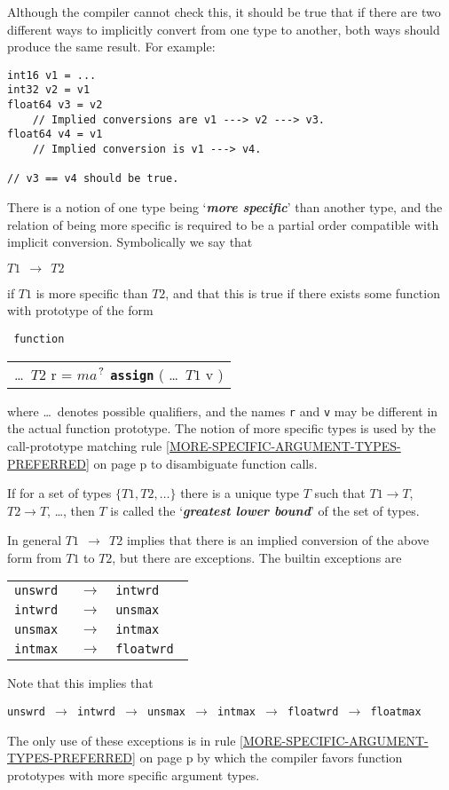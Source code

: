 \documentclass[12pt]{article}
\makeatletter
\newcommand{\TT}[1]{{\tt \bfseries #1}}
\newcommand{\key}[1]{{\bf \em #1}\index{#1}}
\newcommand{\mkey}[2]{{\bf \em #1}\index{#1!#2}}
\newcommand{\ttkey}[1]{\TT{#1}\index{#1@{\tt #1}}}
\newcommand{\pagref}[1]{p\pageref{#1}}
\newcommand{\QMARK}{{$^{\,\mbox{\footnotesize ?}}$}}
\newcommand{\CNV}{\longrightarrow}	%
\newenvironment{indpar}[1][0.3in]%
	{\begin{list}{}%
		     {\setlength{\itemsep}{0in}%
		      \setlength{\topsep}{0in}%
		      \setlength{\parsep}{1ex}%
		      \setlength{\labelwidth}{#1}%
		      \setlength{\leftmargin}{#1}%
		      \addtolength{\leftmargin}{\labelsep}}%
	 \item}%
	{\end{list}}
\makeatother
\begin{document}
Although the compiler cannot check this, it should be true
that if there are two different ways to implicitly convert from
one type to another, both ways should produce the same
result.  For example:
\begin{indpar}\begin{verbatim}
int16 v1 = ...
int32 v2 = v1
float64 v3 = v2
    // Implied conversions are v1 ---> v2 ---> v3.
float64 v4 = v1
    // Implied conversion is v1 ---> v4.

// v3 == v4 should be true.
\end{verbatim}\end{indpar}

There is a notion of one type being `\mkey{more specific}{type}' than
another type, and the relation of being more specific is required
to be a partial order compatible with implicit conversion.  Symbolically
we say that
\begin{center}
{\tt $T1~~\CNV~~T2$}
\end{center}%
\label{MORE-SPECIFIC-RELATION}
if $T1$ is more specific than $T2$, and that this is true if 
there exists some function with prototype of the form

\begin{center} \tt
function \begin{tabular}[t]{@{}l@{}}
	 \ldots{}~$T2$ r =
	 $ma$\QMARK{} \ttkey{assign}
	 ( \ldots{}~$T1$ v )
	 \end{tabular}
\end{center}
where \ldots{}~denotes possible qualifiers, and
the names {\tt r} and {\tt v} may be different
in the actual function prototype.
The notion of more specific
types is used by the
call-prototype matching rule
\ref{MORE-SPECIFIC-ARGUMENT-TYPES-PREFERRED}
on page \pagref{MORE-SPECIFIC-ARGUMENT-TYPES-PREFERRED}
to disambiguate function calls.

If for a set of types $\{T1,T2,\ldots\}$ there is a unique
type $T$ such that $T1\CNV T$, $T2\CNV T$, \ldots{}, then
$T$ is called the `\key{greatest lower bound}'\label{GREATEST-LOWER-BOUND}
of the set of types.

In general $T1~~\CNV~~T2$ implies that there is an implied conversion
of the above form from $T1$ to $T2$, but there are exceptions.
The builtin exceptions
are
\begin{center}
\begin{tabular}{lll}
\tt unswrd	& $\CNV$ & \tt intwrd \\
\tt intwrd	& $\CNV$ & \tt unsmax \\
\tt unsmax	& $\CNV$ & \tt intmax \\
\tt intmax	& $\CNV$ & \tt floatwrd \\
\end{tabular}
\end{center}
Note that this implies that
\begin{center}
\tt unswrd $\CNV$ intwrd $\CNV$ unsmax $\CNV$ intmax
           $\CNV$ floatwrd $\CNV$ floatmax
\end{center}
The only use of these exceptions is in
rule \ref{MORE-SPECIFIC-ARGUMENT-TYPES-PREFERRED}
on page \pagref{MORE-SPECIFIC-ARGUMENT-TYPES-PREFERRED}
by which the compiler favors function prototypes with
more specific argument types.
\end{document}

